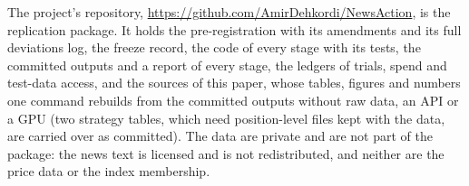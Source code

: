 The project's repository, \url{https://github.com/AmirDehkordi/NewsAction}, is the replication package. It holds
the pre-registration with its amendments and its full deviations log, the freeze record, the code of every stage
with its tests, the committed outputs and a report of every stage, the ledgers of trials, spend and test-data
access, and the sources of this paper, whose tables, figures and numbers one command rebuilds from the committed
outputs without raw data, an API or a GPU (two strategy tables, which need position-level files kept with the
data, are carried over as committed). The data are private and are not part of the package: the news text is
licensed and is not redistributed, and neither are the price data or the index membership.
